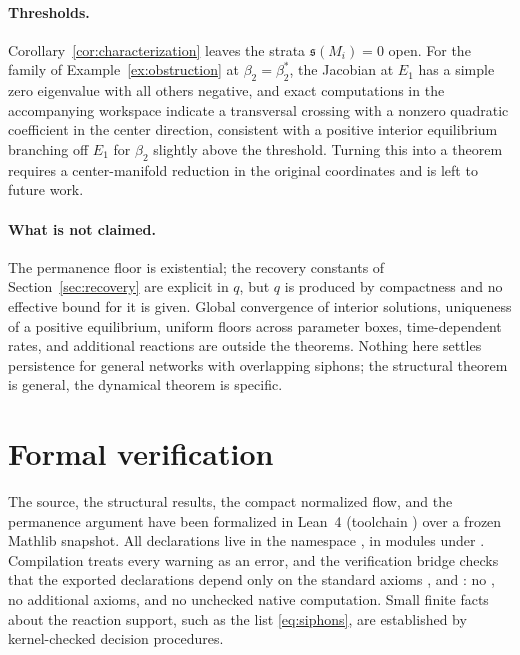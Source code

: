 \documentclass[11pt,a4paper]{article}
\theoremstyle{plain}
\theoremstyle{definition}
\theoremstyle{remark}
\newcommand{\spb}{\mathfrak s}
\begin{document}
\paragraph{Thresholds.}
Corollary~\ref{cor:characterization} leaves the strata $\spb(M_i)=0$ open. For the family of Example~\ref{ex:obstruction} at $\beta_2=\beta_2^*$, the Jacobian at $E_1$ has a simple zero eigenvalue with all others negative, and exact computations in the accompanying workspace indicate a transversal crossing with a nonzero quadratic coefficient in the center direction, consistent with a positive interior equilibrium branching off $E_1$ for $\beta_2$ slightly above the threshold. Turning this into a theorem requires a center-manifold reduction in the original coordinates and is left to future work.

\paragraph{What is not claimed.}
The permanence floor is existential; the recovery constants of Section~\ref{sec:recovery} are explicit in $q$, but $q$ is produced by compactness and no effective bound for it is given. Global convergence of interior solutions, uniqueness of a positive equilibrium, uniform floors across parameter boxes, time-dependent rates, and additional reactions are outside the theorems. Nothing here settles persistence for general networks with overlapping siphons; the structural theorem is general, the dynamical theorem is specific.

\section{Formal verification}\label{sec:formal}

The source, the structural results, the compact normalized flow, and the permanence argument have been formalized in Lean~4 (toolchain ) over a frozen Mathlib snapshot. All declarations live in the namespace , in modules under . Compilation treats every warning as an error, and the verification bridge checks that the exported declarations depend only on the standard axioms ,  and : no , no additional axioms, and no unchecked native computation. Small finite facts about the reaction support, such as the list \eqref{eq:siphons}, are established by kernel-checked decision procedures.
\end{document}
